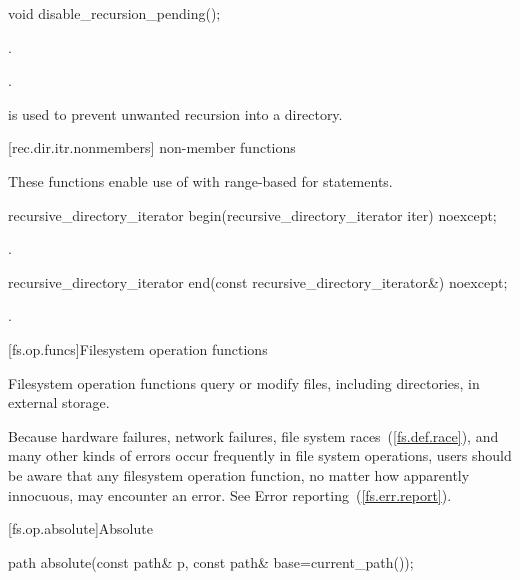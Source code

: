 \begin{itemdecl}
void disable_recursion_pending();
\end{itemdecl}

\begin{itemdescr}
\pnum
\requires {}.

\pnum
\postcondition {}.

\pnum
\enternote {}\tcode{()} is used to prevent
  unwanted recursion into a directory. \exitnote
\end{itemdescr}

[rec.dir.itr.nonmembers]{ non-member functions}

\pnum
These functions enable use of 
with range-based for statements.

\begin{itemdecl}
recursive_directory_iterator begin(recursive_directory_iterator iter) noexcept;
\end{itemdecl}

\begin{itemdescr}
\pnum
\returns {}.
\end{itemdescr}

\begin{itemdecl}
recursive_directory_iterator end(const recursive_directory_iterator&) noexcept;
\end{itemdecl}

\begin{itemdescr}
\pnum
\returns {}.
\end{itemdescr}

[fs.op.funcs]{Filesystem operation functions}

\pnum
Filesystem operation functions query or modify files, including directories,
in external storage.

\pnum
\enternote Because hardware failures, network failures, file system races~(\ref{fs.def.race}),
and many other kinds of errors occur frequently in file system operations, users should be aware
that any filesystem operation function, no matter how apparently innocuous, may encounter
an error. See Error reporting~(\ref{fs.err.report}). \exitnote

[fs.op.absolute]{Absolute}

\begin{itemdecl}
path absolute(const path& p, const path& base=current_path());
\end{itemdecl}

